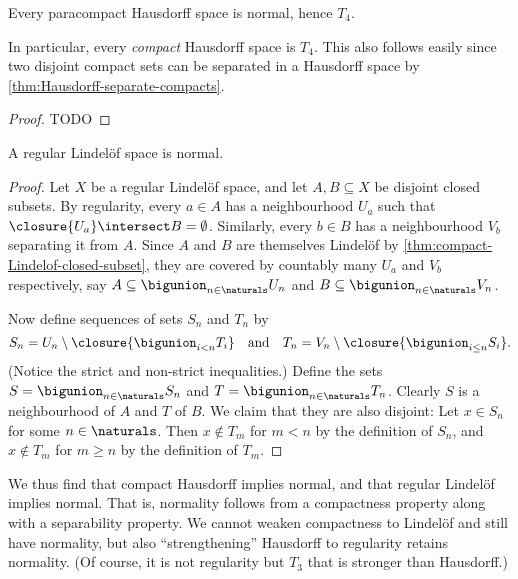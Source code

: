 \documentclass[article, a4paper, 11pt, oneside]{memoir}
\numberwithin{equation}{chapter}
\begin{document}
\begin{proposition}
    \label{thm:paracompact-Hausdorff-is-normal}
    Every paracompact Hausdorff space is normal, hence $T_4$.
\end{proposition}
%
In particular, every \emph{compact} Hausdorff space is $T_4$. This also follows easily since two disjoint compact sets can be separated in a Hausdorff space by \cref{thm:Hausdorff-separate-compacts}.

\begin{proof}
    TODO
\end{proof}


\begin{proposition}
    A regular Lindelöf space is normal.
\end{proposition}

\begin{proof}
    Let $X$ be a regular Lindelöf space, and let $A,B \subseteq X$ be disjoint closed subsets. By regularity, every $a \in A$ has a neighbourhood $U_a$ such that $\closure{U_a} \intersect B = \emptyset$. Similarly, every $b \in B$ has a neighbourhood $V_b$ separating it from $A$. Since $A$ and $B$ are themselves Lindelöf by \cref{thm:compact-Lindelof-closed-subset}, they are covered by countably many $U_a$ and $V_b$ respectively, say $A \subseteq \bigunion_{n \in \naturals} U_n$ and $B \subseteq \bigunion_{n \in \naturals} V_n$.

    Now define sequences of sets $S_n$ and $T_n$ by
    \begin{equation*}
        S_n = U_n \setminus \closure{ \bigunion_{i < n} T_i}
        \quad \text{and} \quad
        T_n = V_n \setminus \closure{ \bigunion_{i \leq n} S_i}.
    \end{equation*}
    (Notice the strict and non-strict inequalities.) Define the sets $S = \bigunion_{n \in \naturals} S_n$ and $T = \bigunion_{n \in \naturals} T_n$. Clearly $S$ is a neighbourhood of $A$ and $T$ of $B$. We claim that they are also disjoint: Let $x \in S_n$ for some $n \in \naturals$. Then $x \not\in T_m$ for $m < n$ by the definition of $S_n$, and $x \not\in T_m$ for $m \geq n$ by the definition of $T_m$. 
\end{proof}

We thus find that compact Hausdorff implies normal, and that regular Lindelöf implies normal. That is, normality follows from a compactness property along with a separability property. We cannot weaken compactness to Lindelöf and still have normality, but also \enquote{strengthening} Hausdorff to regularity retains normality. (Of course, it is not regularity but $T_3$ that is stronger than Hausdorff.)
\end{document}
